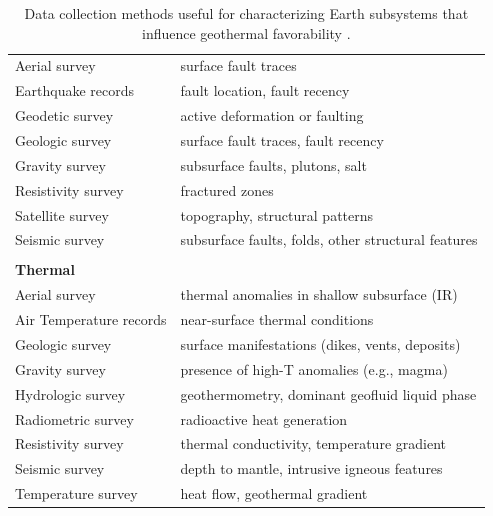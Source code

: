 \begin{table}
\begin{tabular}{ll}
Aerial survey           & surface fault traces                                     \\
Earthquake records      & fault location, fault recency                                  \\
Geodetic survey         & active deformation or faulting                           \\
Geologic survey         & surface fault traces, fault recency                      \\
Gravity survey          & subsurface faults, plutons, salt                         \\
Resistivity survey      & fractured zones                                          \\
Satellite survey        & topography, structural patterns                          \\
Seismic survey          & subsurface faults, folds, other structural features      \\
                        &                                                          \\
\textbf{Thermal}        &                                                          \\ \hline
Aerial survey           & thermal anomalies in shallow subsurface (IR)             \\
Air Temperature records & near-surface thermal conditions                          \\
Geologic survey         & surface manifestations (dikes, vents, deposits)          \\
Gravity survey          & presence of high-T anomalies (e.g., magma)                \\
Hydrologic survey       & geothermometry, dominant geofluid liquid phase           \\
Radiometric survey      & radioactive heat generation                              \\
Resistivity survey      & thermal conductivity, temperature gradient               \\
Seismic survey          & depth to mantle, intrusive igneous features              \\
Temperature survey      & heat flow, geothermal gradient                          
\end{tabular}
\caption[Data collection methods for geothermal subsystems]{Data collection methods useful for characterizing Earth subsystems that influence geothermal favorability \protect{}.}
\label{tab:survey_types}
\end{table}

